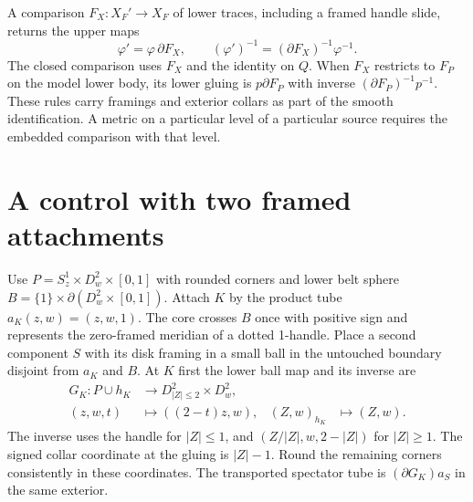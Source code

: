 \documentclass[11pt,letterpaper]{article}
\numberwithin{equation}{section}
\theoremstyle{remark}
\begin{document}
A comparison \(F_X:X_F'\to X_F\) of lower traces, including a framed
handle slide, returns the upper maps
\begin{equation}\label{eq:reglue}
 \varphi'=\varphi\,\partial F_X,\qquad
 (\varphi')^{-1}=(\partial F_X)^{-1}\varphi^{-1}.
\end{equation}
The closed comparison uses \(F_X\) and the identity on \(Q\).
When \(F_X\) restricts to \(F_P\) on the model lower body, its lower
gluing is \(p\partial F_P\) with inverse
\((\partial F_P)^{-1}p^{-1}\). These rules carry framings and
exterior collars as part of the smooth identification. A metric
on a particular level of a particular source requires the
embedded comparison with that level.

\section{A control with two framed attachments}\label{sec:control}
Use \(P=S^1_z\times D^2_w\times[0,1]\) with rounded corners and
lower belt sphere \(B=\{1\}\times\partial(D^2_w\times[0,1])\).
Attach \(K\) by the product tube \(a_K(z,w)=(z,w,1)\).
The core crosses \(B\) once with positive sign and represents
the zero-framed meridian of a dotted 1-handle. Place a second
component \(S\) with its disk framing in a small ball in the
untouched boundary disjoint from \(a_K\) and \(B\). At \(K\)
first the lower ball map and its inverse are
\begin{equation}\label{eq:radial}
 \begin{aligned}
 G_K:P\cup h_K&\longrightarrow D^2_{|Z|\le2}\times D^2_w,\\
 (z,w,t)&\longmapsto ((2-t)z,w),&
 (Z,w)_{h_K}&\longmapsto (Z,w).
 \end{aligned}
\end{equation}
The inverse uses the handle for \(|Z|\le1\), and
\((Z/|Z|,w,2-|Z|)\) for \(|Z|\ge1\). The signed collar
coordinate at the gluing is \(|Z|-1\). Round the remaining
corners consistently in these coordinates. The transported
spectator tube is \((\partial G_K)a_S\) in the same exterior.
\end{document}

